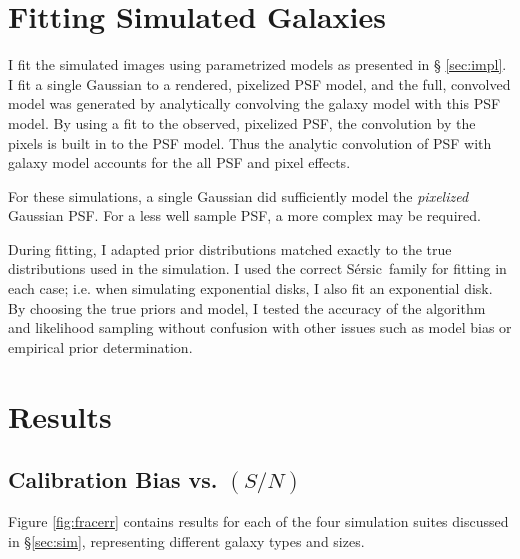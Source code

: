 \documentclass[12pt,preprint]{aastex}
\newcommand{\sn}{$(S/N)$}
\newcommand{\sersic}{S\'{e}rsic}
\begin{document}
\section{Fitting Simulated Galaxies} \label{sec:simfit}

I fit the simulated images using parametrized models as presented in \S
\ref{sec:impl}.   I fit a single Gaussian to a rendered, pixelized PSF model,
and the full, convolved model was generated by analytically convolving the
galaxy model with this PSF model. By using a fit to the observed, pixelized
PSF, the convolution by the pixels is built in to the PSF model. Thus the
analytic convolution of PSF with galaxy model accounts for the all PSF and
pixel effects.

For these simulations, a single Gaussian did sufficiently model the {\it
pixelized} Gaussian PSF. For a less well sample PSF, a more complex may be
required.

During fitting, I adapted prior distributions matched exactly to the true
distributions used in the simulation.  I used the correct \sersic\ family for
fitting in each case; i.e. when simulating exponential disks, I also fit an
exponential disk.  By choosing the true priors and model, I tested the accuracy
of the algorithm and likelihood sampling without confusion with other issues
such as model bias or empirical prior determination.

\section{Results} \label{sec:results}

\subsection{Calibration Bias vs. \sn} \label{sec:snbias}

Figure \ref{fig:fracerr} contains results for each of the four simulation
suites discussed in \S \ref{sec:sim}, representing different galaxy types and
sizes. 
\end{document}
